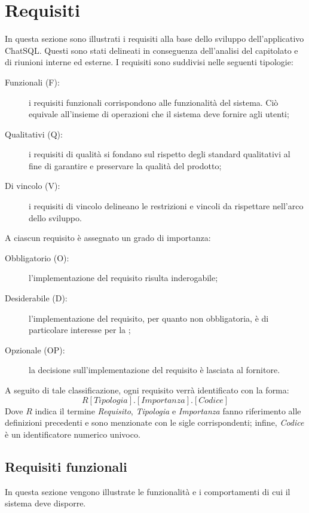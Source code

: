 \section{Requisiti}
\par In questa sezione sono illustrati i requisiti alla base dello sviluppo dell'applicativo ChatSQL. Questi sono stati delineati in conseguenza dell'analisi del capitolato e di riunioni interne ed esterne. I requisiti sono suddivisi nelle seguenti tipologie:
\begin{description}
  \item[Funzionali (F):] i requisiti funzionali corrispondono alle funzionalità del sistema. Ciò equivale all'insieme di operazioni che il sistema deve fornire agli utenti;
  \item[Qualitativi (Q):] i requisiti di qualità si fondano sul rispetto degli standard qualitativi al fine di garantire e preservare la qualità del prodotto;
  \item[Di vincolo (V):] i requisiti di vincolo delineano le restrizioni e vincoli da rispettare nell'arco dello sviluppo.
\end{description}
A ciascun requisito è assegnato un grado di importanza:
\begin{description}
  \item[Obbligatorio (O):] l'implementazione del requisito risulta inderogabile;
  \item[Desiderabile (D):] l'implementazione del requisito, per quanto non obbligatoria, è di particolare interesse per la ;
  \item[Opzionale (OP):] la decisione sull'implementazione del requisito è lasciata al fornitore.
\end{description}
A seguito di tale classificazione, ogni requisito verrà identificato con la forma:
\textbf{\[R[Tipologia].[Importanza].[Codice]\]}
Dove \textbf{\(R\)} indica il termine \emph{Requisito}, \emph{Tipologia} e \emph{Importanza} fanno riferimento alle definizioni precedenti e sono menzionate con le sigle corrispondenti; infine, \emph{Codice} è un identificatore numerico univoco.

\subsection{Requisiti funzionali}
\par In questa sezione vengono illustrate le funzionalità e i comportamenti di cui il sistema deve disporre.

